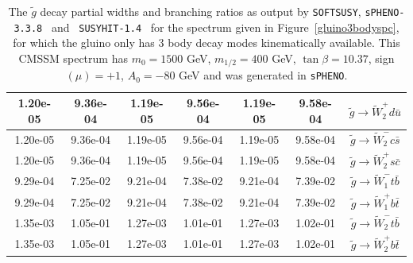 \documentclass[final,3p,times,pdflatex]{elsarticle}
\begin{document}
\begin{center}
\begin{table}
\begin{tabular}{|c|c|c|c|c|c|c|}
1.20e-05 & 9.36e-04 & 1.19e-05 & 9.56e-04 & 1.19e-05 & 9.58e-04 & $\tilde{g} \rightarrow \tilde{W}_2^+ d \bar{u}$ \\ \hline
1.20e-05 & 9.36e-04 & 1.19e-05 & 9.56e-04 & 1.19e-05 & 9.58e-04 & $\tilde{g} \rightarrow \tilde{W}_2^- c \bar{s}$ \\ \hline
1.20e-05 & 9.36e-04 & 1.19e-05 & 9.56e-04 & 1.19e-05 & 9.58e-04 & $\tilde{g} \rightarrow \tilde{W}_2^+ s \bar{c}$ \\ \hline
9.29e-04 & 7.25e-02 & 9.21e-04 & 7.38e-02 & 9.21e-04 & 7.39e-02 & $\tilde{g} \rightarrow \tilde{W}_1^- t \bar{b}$ \\ \hline
9.29e-04 & 7.25e-02 & 9.21e-04 & 7.38e-02 & 9.21e-04 & 7.39e-02 & $\tilde{g} \rightarrow \tilde{W}_1^+ b \bar{t}$ \\ \hline
1.35e-03 & 1.05e-01 & 1.27e-03 & 1.01e-01 & 1.27e-03 & 1.02e-01 & $\tilde{g} \rightarrow \tilde{W}_2^- t \bar{b}$ \\ \hline
1.35e-03 & 1.05e-01 & 1.27e-03 & 1.01e-01 & 1.27e-03 & 1.02e-01 & $\tilde{g} \rightarrow \tilde{W}_2^+ b \bar{t}$ \\ \hline
\end{tabular}
\caption{The $\tilde{g}$ decay partial widths and branching ratios as output
  by {\tt SOFTSUSY}, {\tt sPHENO-3.3.8}~\cite{Porod:2003um} and {\tt
    SUSYHIT-1.4}~\cite{Djouadi:2006bz} for the spectrum given in
  Figure~\ref{gluino3bodyspc}, for which the gluino only has 3 body decay
  modes kinematically available. 
This CMSSM spectrum has $m_0 = 1500$
  GeV, $m_{1/2} 
  = 400$ GeV, $\tan\beta = 10.37$, sign$(\mu) = +1$, $A_0 = -80$ GeV and was
  generated 
  in {\tt sPHENO}.
} 
\label{gluino3bodycomp}
\end{table}
\end{center}
\end{document}
